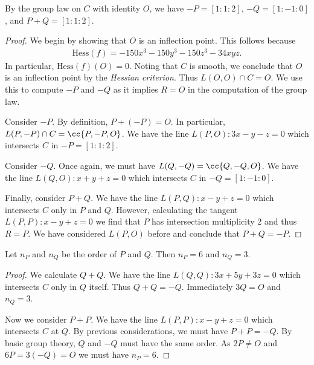 \documentclass{article}
\begin{document}
\begin{claim*}[2]
  By the group law on $C$ with identity $O$, we have $-P=[1:1:2]$, $-Q=[1:-1:0]$,
  and $P+Q=[1:1:2]$.
  \begin{proof}
    We begin by showing that $O$ is an inflection point. This follows because
    \begin{align*}
      \text{Hess}(f) = -150x^3 - 150y^3 - 150z^3 - 34xyz.
    \end{align*}
    In particular, $\text{Hess}(f)(O)=0$. Noting that $C$ is smooth, we conclude that $O$
    is an inflection point by the \emph{Hessian criterion}. Thus $L(O,O)\cap C={O}$.
    We use this to compute $-P$ and $-Q$ as it implies $R=O$ in the computation of the
    group law.

    Consider $-P$. By definition, $P+(-P)=O$. In particular, $L(P,-P)\cap C=\cc{P,-P, O}$.
    We have the line $L(P,O):3x-y-z=0$ which intersects $C$ in $-P=[1:1:2]$.

    Consider $-Q$. Once again, we must have $L(Q,-Q)=\cc{Q,-Q,O}$. We have the line
    $L(Q,O):x+y+z=0$ which intersects $C$ in $-Q=[1:-1:0]$.

    Finally, consider $P+Q$. We have the line $L(P,Q):x-y+z=0$ which intersects
    $C$ only in $P$ and $Q$. However, calculating the tangent $L(P,P):x-y+z=0$
    we find that $P$ has intersection multiplicity 2 and thus $R=P$.
    We have considered $L(P,O)$ before and conclude that $P+Q=-P$.
  \end{proof}
\end{claim*}

\begin{claim*}[3]
  Let $n_P$ and $n_Q$ be the order of $P$ and $Q$. Then $n_P=6$ and $n_Q=3$.
  \begin{proof}
    We calculate $Q+Q$. We have the line $L(Q,Q):3x+5y+3z=0$ which intersects $C$
    only in $Q$ itself. Thus $Q+Q=-Q$. Immediately $3Q=O$ and $n_Q=3$.

    Now we consider $P+P$. We have the line $L(P,P):x-y+z=0$ which intersects $C$ at
    $Q$. By previous considerations, we must have $P+P=-Q$. By basic group theory,
    $Q$ and $-Q$ must have the same order. As $2P\neq O$ and $6P=3(-Q)=O$ we must have $n_P=6$.
  \end{proof}
\end{claim*}
\end{document}
